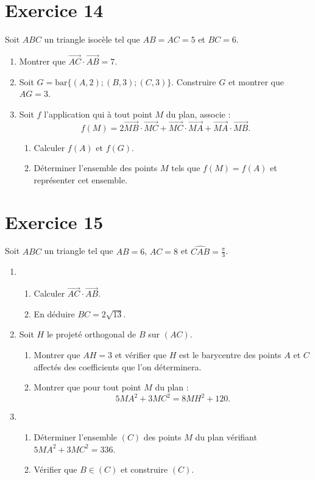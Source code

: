 \documentclass[12pt]{article}
\begin{document}
\section*{Exercice 14}

Soit $ABC$ un triangle isocèle tel que $AB = AC = 5$ et $BC = 6$.

\begin{enumerate}
    \item Montrer que $\overrightarrow{AC} \cdot \overrightarrow{AB} = 7$.

    \item Soit $G = \text{bar}\{(A, 2); (B, 3); (C, 3)\}$. Construire $G$ et montrer que $AG = 3$.

    \item Soit $f$ l’application qui à tout point $M$ du plan, associe :
    \[
    f(M) = 2\overrightarrow{MB} \cdot \overrightarrow{MC} + \overrightarrow{MC} \cdot \overrightarrow{MA} + \overrightarrow{MA} \cdot \overrightarrow{MB}.
    \]
    \begin{enumerate}
        \item Calculer $f(A)$ et $f(G)$.
        \item Déterminer l’ensemble des points $M$ tels que $f(M) = f(A)$ et représenter cet ensemble.
    \end{enumerate}
\end{enumerate}
\section*{Exercice 15}

Soit $ABC$ un triangle tel que $AB = 6$, $AC = 8$ et $\widehat{CAB} = \frac{\pi}{3}$.

\begin{enumerate}
    \item 
    \begin{enumerate}
        \item Calculer $\overrightarrow{AC} \cdot \overrightarrow{AB}$.
        \item En déduire $BC = 2\sqrt{13}$.
    \end{enumerate}

    \item Soit $H$ le projeté orthogonal de $B$ sur $(AC)$.
    \begin{enumerate}
        \item Montrer que $AH = 3$ et vérifier que $H$ est le barycentre des points $A$ et $C$ affectés des coefficients que l’on déterminera.
        \item Montrer que pour tout point $M$ du plan :
        \[
        5MA^2 + 3MC^2 = 8MH^2 + 120.
        \]
    \end{enumerate}

    \item 
    \begin{enumerate}
        \item Déterminer l’ensemble $(C)$ des points $M$ du plan vérifiant $5MA^2 + 3MC^2 = 336$.
        \item Vérifier que $B \in (C)$ et construire $(C)$.
    \end{enumerate}
\end{enumerate}
\end{document}

